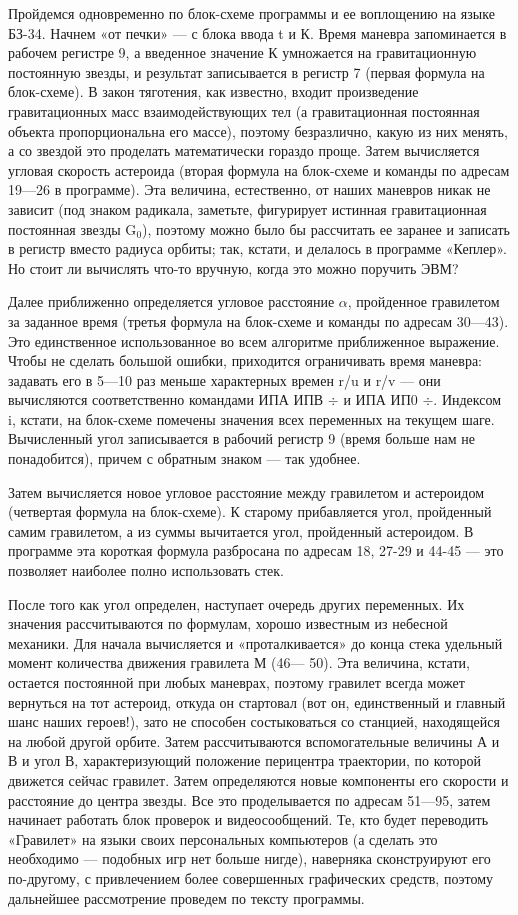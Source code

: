 \documentclass[11pt,a4paper,oneside]{article}
\begin{document}
Пройдемся одновременно по блок-схеме программы и ее воплощению на языке БЗ-34. Начнем «от печки» — с блока ввода t и К. Время маневра запоминается в рабочем регистре 9, а введенное значение К умножается на гравитационную постоянную звезды, и результат записывается в регистр 7 (первая формула на блок-схеме). В закон тяготения, как известно, входит произведение гравитационных масс взаимодействующих тел (а гравитационная постоянная объекта пропорциональна его массе), поэтому безразлично, какую из них менять, а со звездой это проделать математически гораздо проще. Затем вычисляется угловая скорость астероида (вторая формула на блок-схеме и команды по адресам 19—26 в программе). Эта величина, естественно, от наших маневров никак не зависит (под знаком радикала, заметьте, фигурирует истинная гравитационная постоянная звезды G$_{0}$), поэтому можно было бы рассчитать ее заранее и записать в регистр вместо радиуса орбиты; так, кстати, и делалось в программе «Кеплер». Но стоит ли вычислять что-то вручную, когда это можно поручить ЭВМ?

Далее приближенно определяется угловое расстояние $\alpha$, пройденное гравилетом за заданное время (третья формула на блок-схеме и команды по адресам 30—43). Это единственное использованное во всем алгоритме приближенное выражение. Чтобы не сделать большой ошибки, приходится ограничивать время маневра: задавать его в 5—10 раз меньше характерных времен r/u и r/v — они вычисляются соответственно командами ИПА ИПВ $\div$ и ИПА ИП0 $\div$. Индексом i, кстати, на блок-схеме помечены значения всех переменных на текущем шаге. Вычисленный угол записывается в рабочий регистр 9 (время больше нам не понадобится), причем с обратным знаком — так удобнее.

Затем вычисляется новое угловое расстояние между гравилетом и астероидом (четвертая формула на блок-схеме). К старому прибавляется угол, пройденный самим гравилетом, а из суммы вычитается угол, пройденный астероидом. В программе эта короткая формула разбросана по адресам 18, 27-29 и 44-45 — это позволяет наиболее полно использовать стек.

После того как угол определен, наступает очередь других переменных. Их значения рассчитываются по формулам, хорошо известным из небесной механики. Для начала вычисляется и «проталкивается» до конца стека удельный момент количества движения гравилета М (46— 50). Эта величина, кстати, остается постоянной при любых маневрах, поэтому гравилет всегда может вернуться на тот астероид, откуда он стартовал (вот он, единственный и главный шанс наших героев!), зато не способен состыковаться со станцией, находящейся на любой другой орбите. Затем рассчитываются вспомогательные величины А и В и угол В, характеризующий положение перицентра траектории, по которой движется сейчас гравилет. Затем определяются новые компоненты его скорости и расстояние до центра звезды. Все это проделывается по адресам 51—95, затем начинает работать блок проверок и видеосообщений. Те, кто будет переводить «Гравилет» на языки своих персональных компьютеров (а сделать это необходимо — подобных игр нет больше нигде), наверняка сконструируют его по-другому, с привлечением более совершенных графических средств, поэтому дальнейшее рассмотрение проведем по тексту программы.
\end{document}
